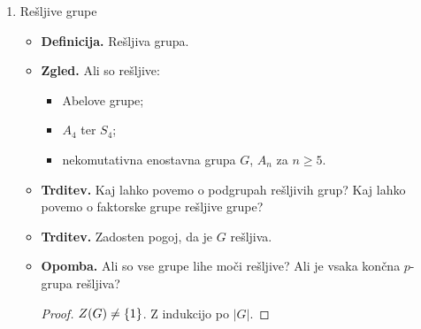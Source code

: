\begin{enumerate}
    \item Rešljive grupe
    \begin{itemize}
        \item \textbf{Definicija.} Rešljiva grupa.
        \item \textbf{Zgled.} Ali so rešljive:
        \begin{itemize}
            \item Abelove grupe;
            \item \(A_4\) ter \(S_4\);
            \item nekomutativna enostavna grupa \(G\), \(A_n\) za \(n \geq 5\).
        \end{itemize}
        \item \textbf{Trditev.} Kaj lahko povemo o podgrupah rešljivih grup? Kaj lahko povemo o faktorske grupe rešljive grupe?
        \item \textbf{Trditev.} Zadosten pogoj, da je \(G\) rešljiva.
        \item \textbf{Opomba.} Ali so vse grupe lihe moči rešljive? Ali je vsaka končna \(p\)-grupa rešljiva?
        \begin{proof}
            \(Z(G) \neq \{1\}\). Z indukcijo po \(|G|\).
        \end{proof}
    \end{itemize}
\end{enumerate}